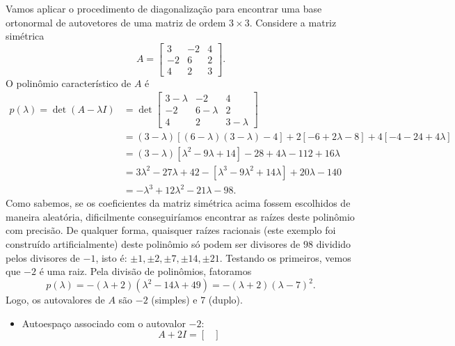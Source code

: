 \begin{ex}
	Vamos aplicar o procedimento de diagonalização para encontrar uma base ortonormal de autovetores de uma matriz de ordem $3 \times 3$. Considere a matriz simétrica
	\begin{equation}
	A =
	\begin{bmatrix}
	3 & -2 & 4 \\
	-2 & 6 & 2 \\
	4 & 2 & 3
	\end{bmatrix}.
	\end{equation} O polinômio característico de $A$ é
          \begin{align*}
	p(\lambda) = \det (A - \lambda I ) & =
	\det
	\begin{bmatrix}
	3- \lambda & -2 & 4 \\
	-2 & 6- \lambda & 2 \\
	4 & 2 & 3- \lambda
	\end{bmatrix} \\
	& = (3-\lambda) \left[ (6 - \lambda)(3 - \lambda) - 4 \right] + 2 \left[ -6 + 2 \lambda - 8 \right]  + 4 \left[ - 4 - 24 + 4 \lambda \right]  \\
	& = (3-\lambda) \left[ \lambda^2 - 9 \lambda + 14 \right] -28 + 4 \lambda - 112 + 16 \lambda  \\
	& = 3\lambda^2 - 27 \lambda + 42  - \left[ \lambda^3 - 9 \lambda^2 + 14 \lambda \right] + 20 \lambda - 140  \\
	& = -\lambda^3 + 12 \lambda^2 - 21 \lambda - 98.
          \end{align*}
 Como sabemos, se os coeficientes da matriz simétrica acima fossem escolhidos de maneira aleatória, dificilmente conseguiríamos encontrar as raízes deste polinômio com precisão. De qualquer forma, quaisquer raízes racionais (este exemplo foi construído artificialmente) deste polinômio só podem ser divisores de $98$ dividido pelos divisores de $-1$, isto é: $\pm 1, \pm 2, \pm 7, \pm 14, \pm 21$. Testando os primeiros, vemos que $-2$ é uma raiz. Pela divisão de polinômios, fatoramos
	\begin{equation}
	p(\lambda) = -(\lambda + 2) (\lambda^2 - 14 \lambda + 49) = -(\lambda + 2)(\lambda - 7)^2.
	\end{equation} Logo, os autovalores de $A$ são $-2$ (simples) e $7$ (duplo).
	\begin{itemize}
		\item Autoespaço associado com o autovalor $-2$:
		\begin{equation}
		A + 2 I =
		\begin{bmatrix}

\end{bmatrix}
\end{equation}
\end{itemize}
\end{ex}
